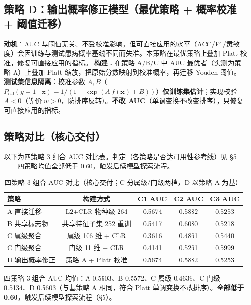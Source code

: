 \documentclass{internal-report}
\begin{document}
\subsection{策略 D：输出概率修正模型（最优策略 + 概率校准 + 阈值迁移）}
\textbf{动机}：AUC 与阈值无关、不受校准影响，但可直接应用的水平（ACC/F1/灵敏度）会因训练与测试患病概率基线不同而失准。本策略在最优策略上叠加 Platt 校准，修复可直接应用的指标。
\textbf{构建}：在策略 A/B/C 中 AUC 最优者（实测为策略 A）上叠加 Platt 缩放\cite{platt1999}，把原始分数映射到校准概率，再迁移 Youden 阈值。
\textbf{测试集信息隔离}：校准参数 $A,B$（$P_{\mathrm{cal}}(y{=}1\mid\mathbf{x}) = 1/(1+\exp(A\,f(\mathbf{x})+B))$）\textbf{仅训练集估计}；实现校验 $A<0$（等价 $w>0$，防排序反转）。\textbf{不改 AUC}（单调变换不改变排序），只修复可直接应用的指标。

\subsection{策略对比（核心交付）}

以下为四策略 3 组合 AUC 对比表。判定（各策略是否达可用性参考线）见 §5——四策略均值全部低于 0.60，触发后续模型探索流程。

\begin{table}[ht]
\centering
\caption{四策略 3 组合 AUC 对比（核心交付；C 分属级/门级两档，D 以策略 A 为基）}
\begin{tabular}{l c c c c}
\toprule
\textbf{策略} & \textbf{构建方式} & \textbf{C1 AUC} & \textbf{C2 AUC} & \textbf{C3 AUC} \\
\midrule
A 直接迁移 & L2+CLR 物种级 264 & 0.5674 & 0.5882 & 0.5253 \\
B 共享标志物 & 共享特征子集 252 重训 & 0.5417 & 0.6080 & 0.5218 \\
C 属级聚合 & 属级 106 维 + CLR & 0.3616 & 0.4861 & 0.5440 \\
C 门级聚合 & 门级 11 维 + CLR & 0.4141 & 0.5261 & 0.5999 \\
D 输出概率修正 & 策略 A + Platt 校准 & 0.5674 & 0.5882 & 0.5253 \\
\bottomrule
\end{tabular}
\label{tab:strategy-compare}
\end{table}

四策略 3 组合 AUC 均值：A 0.5603、B 0.5572、C 属级 0.4639、C 门级 0.5134、D 0.5603（与基策略 A 相同，符合 Platt 单调变换不改排序）。\textbf{全部低于 0.60}，触发后续模型探索流程（§5）。

\end{document}

